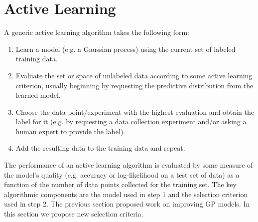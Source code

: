 \documentclass[prd,nofootbib,floatfix,11pt,tightenlines,nofootinbib]{revtex4}
\begin{document}
\section{Active Learning}
\label{sec:active_learning}

A generic active learning algorithm takes the following form:

\vspace{.5\baselineskip}
\begin{enumerate}

\item Learn a model (e.g. a Gaussian process) using the current set of
  labeled training data.

\item Evaluate the set or space of unlabeled data according to some active
  learning criterion, usually beginning by requesting the predictive
  distribution from the learned model.

\item Choose the data point/experiment with the highest evaluation and
  obtain the label for it (e.g. by requesting a data collection experiment
  and/or asking a human expert to provide the label).

\item Add the resulting data to the training data and repeat.

\end{enumerate}
\vspace{.5\baselineskip}

The performance of an active learning algorithm is evaluated by some
measure of the model's quality (e.g. accuracy or log-likelihood on a test
set of data) as a function of the number of data points collected for the
training set.  The key algorithmic components are the model used in step 1
and the selection criterion used in step 2.  The previous section proposed
work on improving GP models.  In this section we propose new selection
criteria.


\end{document}
